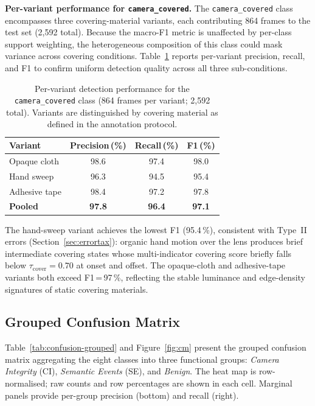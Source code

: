 \documentclass[sensors,article,submit,pdftex,moreauthors]{Definitions/mdpi}
\begin{document}
\textbf{Per-variant performance for \texttt{camera\_covered}.}
The \texttt{camera\_covered} class encompasses three covering-material
variants, each contributing 864 frames to the test set (2{,}592 total).
Because the macro-F1 metric is unaffected by per-class support weighting,
the heterogeneous composition of this class could mask variance across
covering conditions. Table~\ref{tab:covered-variants} reports per-variant
precision, recall, and F1 to confirm uniform detection quality across all
three sub-conditions.
 
\begin{table}[H]
\caption{Per-variant detection performance for the \texttt{camera\_covered}
class (864 frames per variant; 2{,}592 total). Variants are distinguished
by covering material as defined in the annotation protocol.}
\label{tab:covered-variants}
\centering\small\setlength{\tabcolsep}{6pt}
\begin{tabular}{lccc}
\toprule
\textbf{Variant} & \textbf{Precision\,(\%)} & \textbf{Recall\,(\%)} & \textbf{F1\,(\%)} \\
\midrule
Opaque cloth      & 98.6 & 97.4 & 98.0 \\
Hand sweep        & 96.3 & 94.5 & 95.4 \\
Adhesive tape     & 98.4 & 97.2 & 97.8 \\
\midrule
\textbf{Pooled}   & \textbf{97.8} & \textbf{96.4} & \textbf{97.1} \\
\bottomrule
\end{tabular}
\end{table}
 
The hand-sweep variant achieves the lowest F1 (95.4\,\%), consistent with
Type~II errors (Section~\ref{sec:errortax}): organic hand motion over the
lens produces brief intermediate covering states whose multi-indicator
covering score briefly falls below $\tau_{\text{cover}} = 0.70$ at onset
and offset. The opaque-cloth and adhesive-tape variants both exceed F1\,=\,97\,\%,
reflecting the stable luminance and edge-density signatures of static
covering materials.
 
\subsection{Grouped Confusion Matrix}
\label{sec:cm}
 
Table~\ref{tab:confusion-grouped} and Figure~\ref{fig:cm} present the
grouped confusion matrix aggregating the eight classes into three functional
groups: \emph{Camera Integrity} (CI), \emph{Semantic Events} (SE), and
\emph{Benign}. The heat map is row-normalised; raw counts and row percentages
are shown in each cell. Marginal panels provide per-group precision (bottom)
and recall (right).
 
\end{document}
